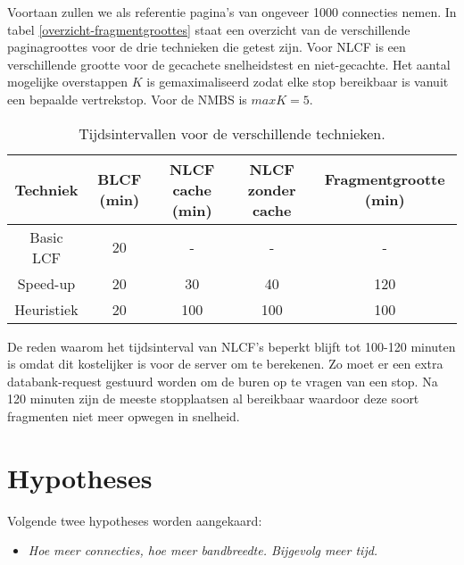 Voortaan zullen we als referentie pagina's van ongeveer 1000 connecties nemen. In tabel \ref{overzicht-fragmentgroottes} staat een overzicht van de verschillende paginagroottes voor de drie technieken die getest zijn. Voor NLCF is een verschillende grootte voor de gecachete snelheidstest en niet-gecachte. Het aantal mogelijke overstappen $K$ is gemaximaliseerd zodat elke stop bereikbaar is vanuit een bepaalde vertrekstop. Voor de NMBS is $max K = 5$.

\begin{table}[htbp]
\centering
\begin{tabular}{ | c || c | c | c | c |}
  \hline
  Techniek & BLCF (min) & NLCF cache (min)& NLCF zonder cache & Fragmentgrootte (min) \\ \hline
  Basic LCF & 20 & - & - & - \\
  Speed-up & 20 & 30 & 40 & 120 \\
  Heuristiek & 20 & 100 & 100 & 100 \\
\hline
\end{tabular}
\caption{Tijdsintervallen voor de verschillende technieken.}
\label{table:tijdsintervallen}
\end{table}

De reden waarom het tijdsinterval van NLCF's beperkt blijft tot 100-120 minuten is omdat dit kostelijker is voor de server om te berekenen. Zo moet er een extra databank-request gestuurd worden om de buren op te vragen van een stop. Na 120 minuten zijn de meeste stopplaatsen al bereikbaar waardoor deze soort fragmenten niet meer opwegen in snelheid.

\section{Hypotheses}
Volgende twee hypotheses worden aangekaard:

\begin{itemize}
\item \emph{Hoe meer connecties, hoe meer bandbreedte. Bijgevolg meer tijd.}
\end{itemize}

